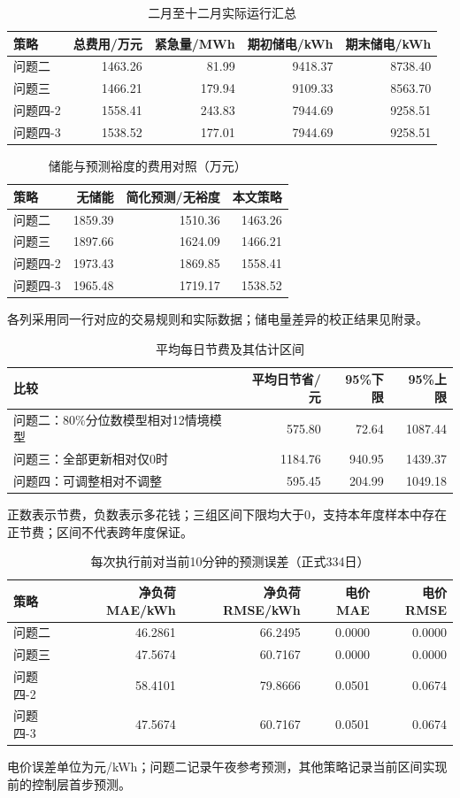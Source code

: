 \begin{table}[H]\centering\small\caption{二月至十二月实际运行汇总}
\begin{tabular}{lrrrr}\toprule
策略 & 总费用/万元 & 紧急量/MWh & 期初储电/kWh & 期末储电/kWh\\\midrule
问题二 & 1463.26 & 81.99 & 9418.37 & 8738.40\\
问题三 & 1466.21 & 179.94 & 9109.33 & 8563.70\\
问题四-2 & 1558.41 & 243.83 & 7944.69 & 9258.51\\
问题四-3 & 1538.52 & 177.01 & 7944.69 & 9258.51\\
\bottomrule\end{tabular}\end{table}
\begin{table}[H]\centering\small\caption{储能与预测裕度的费用对照（万元）}
\begin{tabular}{lrrr}\toprule
策略 & 无储能 & 简化预测/无裕度 & 本文策略\\\midrule
问题二 & 1859.39 & 1510.36 & 1463.26\\
问题三 & 1897.66 & 1624.09 & 1466.21\\
问题四-2 & 1973.43 & 1869.85 & 1558.41\\
问题四-3 & 1965.48 & 1719.17 & 1538.52\\
\bottomrule\end{tabular}\par\footnotesize 各列采用同一行对应的交易规则和实际数据；储电量差异的校正结果见附录。\end{table}
\begin{table}[H]\centering\small\caption{平均每日节费及其估计区间}
\begin{tabular}{lrrr}\toprule
比较 & 平均日节省/元 & 95\%下限 & 95\%上限\\\midrule
问题二：80\%分位数模型相对12情境模型 & 575.80 & 72.64 & 1087.44\\
问题三：全部更新相对仅0时 & 1184.76 & 940.95 & 1439.37\\
问题四：可调整相对不调整 & 595.45 & 204.99 & 1049.18\\
\bottomrule\end{tabular}\par\footnotesize 正数表示节费，负数表示多花钱；三组区间下限均大于0，支持本年度样本中存在正节费；区间不代表跨年度保证。\end{table}
\begin{table}[H]\centering\small\caption{每次执行前对当前10分钟的预测误差（正式334日）}
\begin{tabular}{lrrrr}\toprule
策略 & 净负荷MAE/kWh & 净负荷RMSE/kWh & 电价MAE & 电价RMSE\\\midrule
问题二 & 46.2861 & 66.2495 & 0.0000 & 0.0000\\
问题三 & 47.5674 & 60.7167 & 0.0000 & 0.0000\\
问题四-2 & 58.4101 & 79.8666 & 0.0501 & 0.0674\\
问题四-3 & 47.5674 & 60.7167 & 0.0501 & 0.0674\\
\bottomrule\end{tabular}\par\footnotesize 电价误差单位为元/kWh；问题二记录午夜参考预测，其他策略记录当前区间实现前的控制层首步预测。\end{table}
